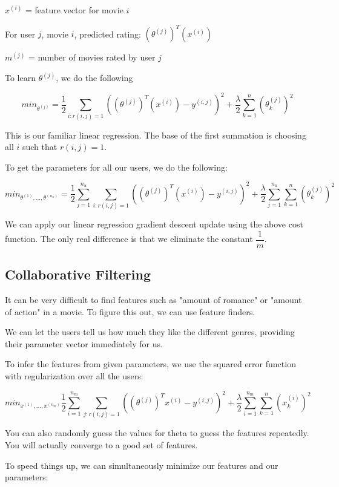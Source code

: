 \documentclass[a4paper,11pt]{report}
\begin{document}
$x^{(i)}$ = feature vector for movie $i$

For user $j$, movie $i$, predicted rating: $(\theta^{(j)})^T(x^{(i)})$

$m^{(j)}$ = number of movies rated by user $j$

To learn $\theta^{(j)}$, we do the following

$$min_{\theta^{(j)}} = \dfrac{1}{2}\displaystyle \sum_{i:r(i,j)=1} ((\theta^{(j)})^T(x^{(i)}) - y^{(i,j)})^2 + \dfrac{\lambda}{2} \sum_{k=1}^n(\theta_k^{(j)})^2$$

This is our familiar linear regression. The base of the first summation is choosing all $i$ such that $r(i,j) = 1$.

To get the parameters for all our users, we do the following:

$$min_{\theta^{(1)},\dots,\theta^{(n_u)}} = \dfrac{1}{2}\displaystyle \sum_{j=1}^{n_u} \sum_{i:r(i,j)=1} ((\theta^{(j)})^T(x^{(i)}) - y^{(i,j)})^2 + \dfrac{\lambda}{2} \sum_{j=1}^{n_u} \sum_{k=1}^n(\theta_k^{(j)})^2$$

We can apply our linear regression gradient descent update using the above cost function. The only real difference is that we eliminate the constant $\dfrac{1}{m}$.

\subsection*{Collaborative Filtering}

It can be very difficult to find features such as "amount of romance" or "amount of action" in a movie. To figure this out, we can use feature finders.

We can let the users tell us how much they like the different genres, providing their parameter vector immediately for us.

To infer the features from given parameters, we use the squared error function with regularization over all the users:

$$min_{x^{(1)},\dots,x^{(n_m)}} \dfrac{1}{2} \displaystyle \sum_{i=1}^{n_m} \sum_{j:r(i,j)=1} ((\theta^{(j)})^T x^{(i)} - y^{(i,j)})^2 + \dfrac{\lambda}{2}\sum_{i=1}^{n_m} \sum_{k=1}^{n} (x_k^{(i)})^2$$

You can also randomly guess the values for theta to guess the features repeatedly. You will actually converge to a good set of features.

To speed things up, we can simultaneously minimize our features and our parameters:
\end{document}
